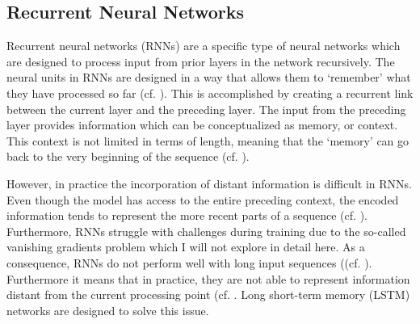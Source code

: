 


\subsection{Recurrent Neural Networks}
Recurrent neural networks (RNNs) are a specific type of neural networks which are designed to process input from prior layers in the network recursively. 
The neural units in RNNs are designed in a way that allows them to `remember' what they have processed so far (cf. \cite[23]{vajjala_practical_2020}). This is accomplished by creating a recurrent link between the current layer and the preceding layer. The input from the preceding layer provides information which can be conceptualized as memory, or context. This context is not limited in terms of length, meaning that the `memory' can go back to the very beginning of the sequence (cf. \cite[4]{jurafsky_2021_9}).  

However, in practice the incorporation of distant information is difficult in RNNs. Even though the model has access to the entire preceding context, the encoded information tends to represent the more recent parts of a sequence (cf. \cite[13]{jurafsky_2021_9}). Furthermore, RNNs struggle with challenges during training due to the so-called vanishing gradients problem which I will not explore in detail here. As a consequence, RNNs do not perform well with long input sequences ((cf. \cite[15]{jurafsky_2021_9}). Furthermore it means that in practice, they are not able to represent information distant from the current processing point (cf. \cite[13]{jurafsky_2021_9}. Long short-term memory (LSTM) networks are designed to solve this issue. 

